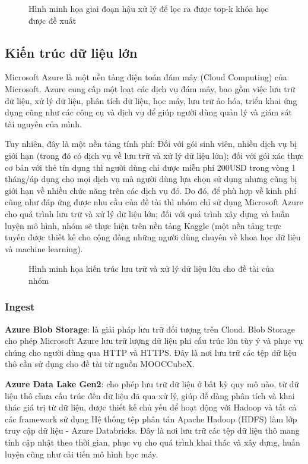 \begin{figure}[h]
    \centering
    \caption{Hình minh họa giai đoạn hậu xử lý để lọc ra được top-k khóa học được đề xuất}
    \label{fig:image2}
\end{figure}

\subsection{Kiến trúc dữ liệu lớn}
Microsoft Azure là một nền tảng điện toán đám mây (Cloud Computing) của Microsoft. Azure cung cấp một loạt các dịch vụ đám mây, bao gồm việc lưu trữ dữ liệu, xử lý dữ liệu, phân tích dữ liệu, học máy, lưu trữ ảo hóa, triển khai ứng dụng cũng như các công cụ và dịch vụ để giúp người dùng quản lý và giám sát tài nguyên của mình. 

Tuy nhiên, đây là một nền tảng tính phí: Đối với gói sinh viên, nhiều dịch vụ bị giới hạn (trong đó có dịch vụ về lưu trữ và xử lý dữ liệu lớn); đối với gói xác thực cơ bản với thẻ tín dụng thì người dùng chỉ được miễn phí 200USD trong vòng 1 tháng/áp dụng cho mọi dịch vụ mà người dùng lựa chọn sử dụng nhưng cũng bị giới hạn về nhiều chức năng trên các dịch vụ đó. Do đó, để phù hợp về kinh phí cũng như đáp ứng được nhu cầu của đề tài thì nhóm chỉ sử dụng Microsoft Azure cho quá trình lưu trữ và xử lý dữ liệu lớn; đối với quá trình xây dựng và huấn luyện mô hình, nhóm sẽ thực hiện trên nền tảng Kaggle (một nền tảng trực tuyến được thiết kế cho cộng đồng những người dùng chuyên về khoa học dữ liệu và machine learning).

\begin{figure}[h]
    \centering
    \caption{Hình minh họa kiến trúc lưu trữ và xử lý dữ liệu lớn cho đề tài của nhóm}
    \label{fig:image3}
\end{figure}

\subsubsection{Ingest}
\textbf{Azure Blob Storage}: là giải pháp lưu trữ đối tượng trên Cloud. Blob Storage cho phép Microsoft Azure lưu trữ lượng dữ liệu phi cấu trúc lớn tùy ý và phục vụ chúng cho người dùng qua HTTP và HTTPS. Đây là nơi lưu trữ các tệp dữ liệu thô cần sử dụng cho đề tài từ nguồn MOOCCubeX.

\textbf{Azure Data Lake Gen2}: cho phép lưu trữ dữ liệu ở bất kỳ quy mô nào, từ dữ liệu thô chưa cấu trúc đến dữ liệu đã qua xử lý, giúp dễ dàng phân tích và khai thác giá trị từ dữ liệu, được thiết kế chủ yếu để hoạt động với Hadoop và tất cả các framework sử dụng Hệ thống tệp phân tán Apache Hadoop (HDFS) làm lớp truy cập dữ liệu - Azure Databricks. Đây là nơi lưu trữ các tệp dữ liệu thô mang tính cập nhật theo thời gian, phục vụ cho quá trình khai thác và xây dựng, huấn luyện cũng như cải tiến mô hình học máy.

